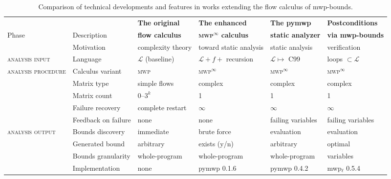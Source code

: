 \begin{landscape}
\begin{table}[p]
\begin{NiceTabularX}{\hsize}{XXllll}
\toprule
  & & \textbf{The original} & \textbf{The enhanced} & \textbf{The pymwp} & \textbf{Postconditions} \\
Phase & Description & \textbf{flow calculus} & \textbf{\textsc{mwp}\(^\infty\) calculus} & \textbf{static analyzer} & \textbf{via mwp-bounds} \\
\midrule
  & Motivation & complexity theory & toward static analysis & static analysis & verification \\
\textsc{analysis input}
  & Language & \(\mathcal{L}\) (baseline) & \(\mathcal{L} + f +\) recursion & \(\mathcal{L} \mapsto \) C99 & loops \(\subset \mathcal{L}\) \\
\textsc{analysis procedure}
  & Calculus variant & \textsc{mwp} & \textsc{mwp}\(^\infty\) & \textsc{mwp}\(^\infty\) & \textsc{mwp}\(^\infty\) \\
  & Matrix type & simple flows & complex & complex & complex \\
  & Matrix count & 0--\(3^k\) & 1 & 1 & 1 \\
  & Failure recovery & complete restart & \(\infty\) & \(\infty\) & \(\infty\) \\
  & Feedback on failure & none & none & failing variables & failing variables \\
\textsc{analysis output}
  & Bounds discovery & immediate & brute force & evaluation & evaluation \\
  & Generated bound & arbitrary & exists (y/n) & arbitrary & optimal \\
  & Bounds granularity & whole-program & whole-program & whole-program & variables \\
  & Implementation & none & pymwp 0.1.6 & pymwp 0.4.2 & mwp\(_\ell\) 0.5.4 \\
\bottomrule
\end{NiceTabularX}
\caption[Technical developments of the flow calculus of mwp-bounds]
{Comparison of technical developments and features in works extending the flow calculus of mwp-bounds.}
\label{tab:evo}
\end{table}
\end{landscape}

